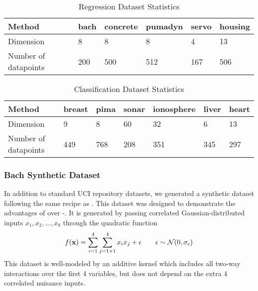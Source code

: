 \begin{table}[h]
\caption{Regression Dataset Statistics}
\label{tbl:Regression Dataset Statistics}
\begin{center}
\begin{tabular}{l | lllll}
Method & bach & concrete & pumadyn & servo & housing \\ \hline
Dimension      & 8    & 8        & 8       & 4     & 13 \\
Number of datapoints       & 200  & 500      & 512     & 167   & 506
\end{tabular}
\end{center}
\label{table:regression-dataset-stats}
\end{table}
%
\begin{table}[h]
\caption{Classification Dataset Statistics}
\label{tbl:Classification Dataset Statistics}
\begin{center}
\begin{tabular}{l | llllll}
Method & breast & pima & sonar & ionosphere & liver & heart\\ \hline
Dimension      & 9      & 8    & 60    & 32         & 6     & 13 \\
Number of datapoints      & 449    & 768  & 208   & 351        & 345   & 297
\end{tabular}
\end{center}
\label{table:classification-dataset-stats}
\end{table}

\subsubsection{Bach Synthetic Dataset}
In addition to standard UCI repository datasets, we generated a synthetic dataset following the same recipe as \citet{DBLP:journals/corr/abs-0909-0844}.
This dataset was designed to demonstrate the advantages of \HKL{} over \gp{}-\SE{}.
It is generated by passing correlated Gaussian-distributed inputs $x_1, x_2, \dots, x_8$ through the quadratic function
%
\begin{align}
f({\bf{x}}) = \sum_{i=1}^4 \sum_{j=1+1}^4 x_i x_j + \epsilon \qquad \epsilon \sim \mathcal{N}\!\left(0,\sigma_\epsilon\right)
\end{align}
%
This dataset is well-modeled by an additive kernel which includes all two-way interactions over the first 4 variables, but does not depend on the extra 4 correlated nuisance inputs.%

